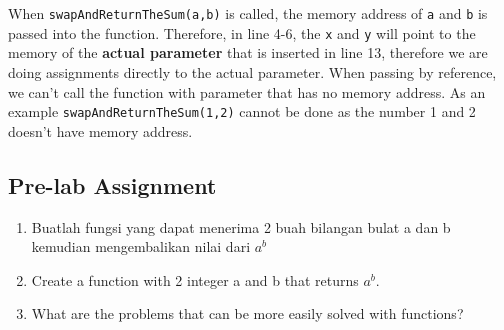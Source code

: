 When \verb|swapAndReturnTheSum(a,b)| is called, 
the memory address of \verb|a| and \verb|b| is passed into 
the function. Therefore, in line 4-6, the \verb|x| and 
\verb|y| will point to the memory of the \textbf{actual parameter} 
that is inserted in line 13, therefore we are doing assignments 
directly to the actual parameter. When passing by reference, 
we can't call the function with parameter that has no memory 
address. As an example \verb|swapAndReturnTheSum(1,2)| cannot be 
done as the number 1 and 2 doesn't have memory address.

\subsection{Pre-lab Assignment}
\begin{enumerate}
    \item Buatlah fungsi yang dapat menerima 2 buah bilangan 
    bulat a dan b kemudian mengembalikan nilai dari $a^b$
    \item Create a function with 2 integer a and 
    b that returns $a^b$.
    \item What are the problems that can be more easily solved with functions?
\end{enumerate}

